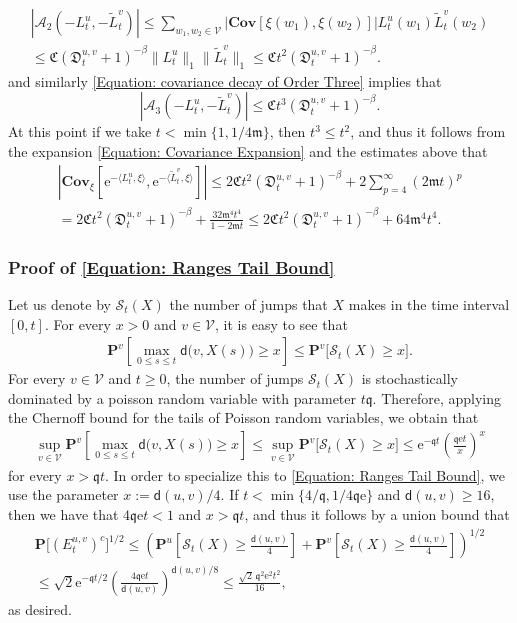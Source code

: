 \documentclass{amsart}
\numberwithin{equation}{section}
\theoremstyle{definition}
\newcommand\be{\beta}
\newcommand\mbf{\mathbf}
\newcommand\mc{\mathcal}
\newcommand\mf{\mathfrak}
\newcommand\mr{\mathrm}
\newcommand\ms{\mathscr}
\newcommand\msf{\mathsf}
\begin{document}
\begin{multline*}
|\mc A_2(-L_t^u,-\tilde L_t^v)|\leq\sum_{w_1,w_2\in\ms V}\big|\mbf{Cov}[\xi(w_1),\xi(w_2)]\big|L_t^u(w_1)\tilde L_t^v(w_2)\\
\leq\mf C(\mf D_t^{u,v}+1)^{-\be}\|L_t^u\|_{1}\|\tilde L_t^v\|_{1}\leq\mf C t^2(\mf D_t^{u,v}+1)^{-\be}.
\end{multline*}
and similarly \eqref{Equation: covariance decay of Order Three} implies that
\[|\mc A_3(-L_t^u,-\tilde L_t^v)|\leq\mf C t^3(\mf D_t^{u,v}+1)^{-\be}.\]
At this point if we take $t<\min\{1,1/4\mf m\}$, then $t^3\leq t^2$,
and thus it follows from the expansion \eqref{Equation: Covariance Expansion}
and the estimates above that
\begin{multline*}
\left|\mbf{Cov}_\xi\left[\mr e^{-\langle L_t^u,\xi\rangle},\mr e^{-\langle\tilde L_t^v,\xi\rangle}\right]\right|
\leq2\mf Ct^2(\mf D_t^{u,v}+1)^{-\be}+2\sum_{p=4}^\infty(2\mf m t)^p\\
=2\mf Ct^2(\mf D_t^{u,v}+1)^{-\be}+\frac{32\mf m^4t^4}{1-2\mf m t}
\leq2\mf Ct^2(\mf D_t^{u,v}+1)^{-\be}+64\mf m^4t^4.
\end{multline*}

%

\subsubsection{Proof of \eqref{Equation: Ranges Tail Bound}}
\label{Section: Covariance Decay Step 2}

%

Let us denote by $\mc S_t(X)$ the number of jumps that $X$ makes
in the time interval $[0,t]$. For every $x>0$ and $v\in\ms V$, it is easy to see that
\begin{align}
\label{Equation: Jumps Tail Bound 1}
\mbf P^v\left[\max_{0\leq s\leq t} \msf d\big(v,X(s)\big)\geq x\right]
\leq\mbf P^v\big[\mc S_t(X)\geq x\big].
\end{align}
For every $v\in\ms V$ and $t\geq0$,
the number of jumps $\mc S_t(X)$ is stochastically dominated by
a poisson random variable with parameter $t\mf q$.
Therefore, applying the Chernoff bound for the tails of Poisson
random variables, we obtain that
\begin{align}
\label{Equation: Tail Bound}
\sup_{v\in\ms V}\mbf P^v\left[\max_{0\leq s\leq t} \msf d\big(v,X(s)\big)\geq x\right]
\leq\sup_{v\in\ms V}\mbf P^v\big[\mc S_t(X)\geq x\big]
\leq\mr e^{-\mf q t}\left(\frac{\mf q\mr e t}{x}\right)^{x}
\end{align}
for every $x>\mf q t$.
In order to specialize this to \eqref{Equation: Ranges Tail Bound},
we use the parameter $x:=\msf d(u,v)/4$. If $t<\min\{4/\mf q,1/4\mf q\mr e\}$ and $\msf d(u,v)\geq16$,
then we have that $4\mf q\mr e t<1$ and $x>\mf qt$,
and thus it follows by a union bound that
\begin{multline*}
\mbf P\big[(E^{u,v}_t)^c\big]^{1/2}\leq\left(\mbf P^u\left[\mc S_t(X)
\geq\frac{\msf d(u,v)}{4}\right]+\mbf P^v\left[\mc S_t(X)\geq\frac{\msf d(u,v)}{4}\right]\right)^{1/2}\\
\leq \sqrt 2\mr e^{-\mf q t/2}\left(\frac{4\mf q\mr e t}{\msf d(u,v)}\right)^{\msf d(u,v)/8}\leq\frac{\sqrt 2\,\mf q^2\mr e^2 t^2}{16},
\end{multline*}
as desired.
\end{document}
